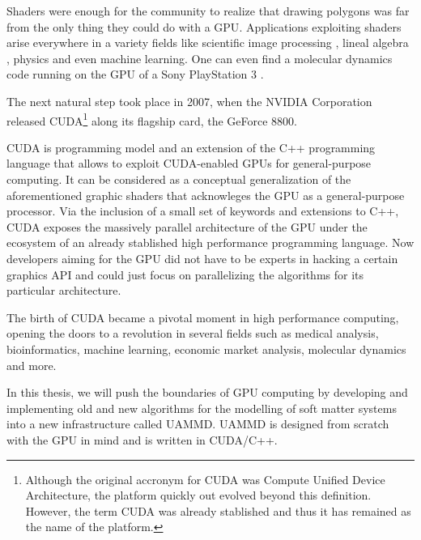 \documentclass[ twoside,openright,titlepage,numbers=noenddot,%
headinclude,footinclude,cleardoublepage=empty,abstract=on,
BCOR=5mm,paper=a4,fontsize=11pt, dvipsnames
]{scrreprt}
\newcommand{\uammd}{\gls{UAMMD}\xspace}
\newcommand{\gpu}{\gls{GPU}\xspace}
\begin{document}
Shaders were enough for the community to realize that drawing polygons was far from the only thing they could do with a \gpu\cite{gpgpu2002}. Applications exploiting shaders arise everywhere in a variety fields like scientific image processing \cite{gpuimage2003, gpuimage2006}, lineal algebra \cite{gpulinalg2001, gpulinalg2003a, gpulinalg2003b}, physics \cite{gpulbm2004} and even machine learning\cite{gpuml2005, gpuml1998}. One can even find a molecular dynamics code running on the \gpu of a Sony PlayStation 3 \cite{ps3md2009}.

The next natural step took place in 2007, when the NVIDIA Corporation released CUDA\cite{cuda}\footnote{Although the original accronym for CUDA was Compute Unified Device Architecture, the platform quickly out evolved beyond this definition. However, the term CUDA was already stablished and thus it has remained as the name of the platform.} along its flagship card, the GeForce 8800.

CUDA is programming model and an extension of the C++ programming language that allows to exploit CUDA-enabled \glspl{GPU} for general-purpose computing. It can be considered as a conceptual generalization of the aforementioned graphic shaders that acknowleges the \gpu as a general-purpose processor. Via the inclusion of a small set of keywords and extensions to C++, CUDA exposes the massively parallel architecture of the \gpu under the ecosystem of an already stablished high performance programming language.
Now developers aiming for the \gpu did not have to be experts in hacking a certain graphics \gls{API} and could just focus on parallelizing the algorithms for its particular architecture.

The birth of CUDA became a pivotal moment in high performance computing, opening the doors to a revolution in several fields such as medical analysis, bioinformatics, machine learning, economic market analysis, molecular dynamics and more.

In this thesis, we will push the boundaries of \gpu computing by developing and implementing old and new algorithms for the modelling of soft matter systems into a new infrastructure called \uammd. \uammd is designed from scratch with the \gpu in mind and is written in CUDA/C++.
\end{document}
